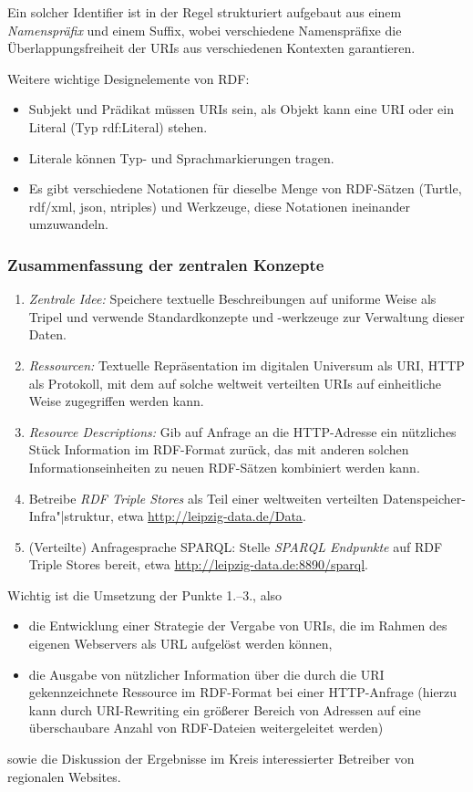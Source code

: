\documentclass[a4paper,11pt]{article}
\begin{document}
Ein solcher Identifier ist in der Regel strukturiert aufgebaut aus einem
\emph{Namenspräfix} und einem Suffix, wobei verschiedene Namenspräfixe die
Überlappungsfreiheit der URIs aus verschiedenen Kontexten garantieren.  

Weitere wichtige Designelemente von RDF:
\begin{itemize}
\item Subjekt und Prädikat müssen URIs sein, als Objekt kann eine URI oder ein
  Literal (Typ rdf:Literal) stehen.
\item Literale können Typ- und Sprachmarkierungen tragen.
\item Es gibt verschiedene Notationen für dieselbe Menge von RDF-Sätzen
  (Turtle, rdf/xml, json, ntriples) und Werkzeuge, diese Notationen ineinander
  umzuwandeln.
\end{itemize}
\subsubsection*{Zusammenfassung der zentralen Konzepte}
\begin{enumerate}
\item \emph{Zentrale Idee:} Speichere textuelle Beschreibungen auf uniforme
  Weise als Tripel und verwende Standardkonzepte und -werkzeuge zur Verwaltung
  dieser Daten.
\item \emph{Ressourcen:} Textuelle Repräsentation im digitalen Universum als
  URI, HTTP als Protokoll, mit dem auf solche weltweit verteilten URIs auf
  einheitliche Weise zugegriffen werden kann.
\item \emph{Resource Descriptions:} Gib auf Anfrage an die HTTP-Adresse ein
  nützliches Stück Information im RDF-Format zurück, das mit anderen solchen
  Informationseinheiten zu neuen RDF-Sätzen kombiniert werden kann.
\item Betreibe \emph{RDF Triple Stores} als Teil einer weltweiten verteilten
  Datenspeicher-Infra"|struktur, etwa \url{http://leipzig-data.de/Data}.  
\item (Verteilte) Anfragesprache SPARQL: Stelle \emph{SPARQL Endpunkte} auf RDF
  Triple Stores bereit, etwa \url{http://leipzig-data.de:8890/sparql}.
\end{enumerate}
Wichtig ist die Umsetzung der Punkte 1.--3., also  
\begin{itemize}
\item die Entwicklung einer Strategie der Vergabe von URIs, die im Rahmen des
  eigenen Webservers als URL aufgelöst werden können,
\item die Ausgabe von nützlicher Information über die durch die URI
  gekennzeichnete Ressource im RDF-Format bei einer HTTP-Anfrage (hierzu kann
  durch URI-Rewriting ein größerer Bereich von Adressen auf eine überschaubare
  Anzahl von RDF-Dateien weitergeleitet werden) 
\end{itemize}
sowie die Diskussion der Ergebnisse im Kreis interessierter Betreiber von
regionalen Websites. 
\end{document}
